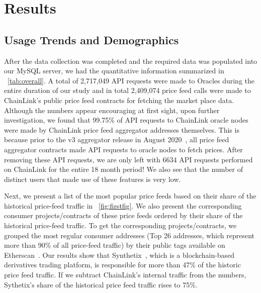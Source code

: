 \documentclass[runningheads]{llncs}
\begin{document}
\section{Results}
\subsection{Usage Trends and Demographics}
After the data collection was completed and the required data was populated into our MySQL server, we had the quantitative information summarized in \tablename ~\ref{tab:overall}. A total of 2,717,049 API requests were made to Oracles during the entire duration of our study and in total 2,409,074 price feed calls were made to ChainLink's public price feed contracts for fetching the market place data. Although the numbers appear encouraging at first sight, upon further investigation, we found that 99.75\% of API requests to ChainLink oracle nodes were made by ChainLink price feed aggregator addresses themselves. This is because prior to the v3 aggregator release in August 2020~\cite{chainlinkdevcomm}, all price feed aggregator contracts made API requests to oracle nodes to fetch prices. After removing these API requests, we are only left with 6634 API requests performed on ChainLink for the entire 18 month period! We also see that the number of distinct users that made use of these features is very low.

Next, we present a list of the most popular price feeds based on their share of the historical price-feed traffic in \figurename~\ref{fig:firstfig}. We also present the corresponding consumer projects/contracts of these price feeds ordered by their share of the historical price-feed traffic. To get the corresponding projects/contracts, we grouped the most regular consumer addresses (Top 26 addresses, which represent more than 90\% of all price-feed traffic) by their public tags available on Etherscan~\cite{team2017etherscan}. Our results show that Synthetix~\cite{synthetix}, which is a blockchain-based derivatives trading platform, is responsible for more than 47\% of the historic price feed traffic. If we subtract ChainLink's internal traffic from the numbers, Sythetix's share of the historical price feed traffic rises to 75\%.
\end{document}
